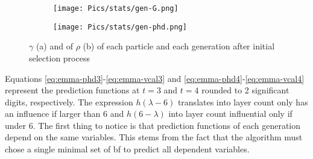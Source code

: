 \begin{figure}[hb]
    \centering
    \begin{subfigure}{.45\textwidth}
        \centering
        \texttt{[image: Pics/stats/gen-G.png]}
        \caption{} \label{fig:emma-G-gen}
    \end{subfigure}
    \begin{subfigure}{.45\textwidth}
        \centering
        \texttt{[image: Pics/stats/gen-phd.png]}
        \caption{} \label{fig:emma-phd-gen}
    \end{subfigure}
    \caption{$\gamma$ (a) and of $\rho$ (b) of each particle and each generation after initial selection process} 
    \label{fig:emma-gen}
\end{figure}

Equations \ref{eq:emma-phd3}-\ref{eq:emma-vcal3} and \ref{eq:emma-phd4}-\ref{eq:emma-vcal4} represent the prediction functions at $t=3$ and $t=4$ rounded to 2 significant digits, respectively.
The expression $h(\lambda-6)$ translates into layer count only has an influence if larger than 6 
and $h(6-\lambda)$ into layer count influential only if under 6.
%
The first thing to notice is that prediction functions of each generation depend on the same variables. 
This stems from the fact that the algorithm must chose a single minimal set of \gls{bf} to predict all dependent variables. 
%


